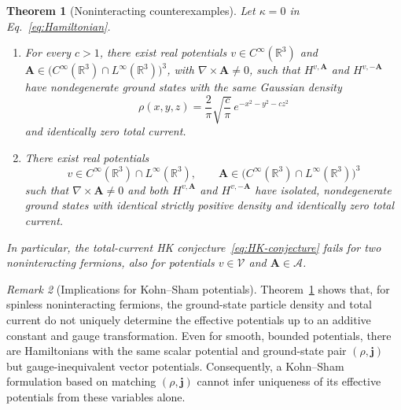 \documentclass[11pt,a4paper]{article}
\newtheorem{theorem}{Theorem}[section]
\theoremstyle{remark}
\newtheorem{remark}[theorem]{Remark}
\theoremstyle{plain}
\newcommand{\R}{\mathbb R}
\newcommand{\jj}{\mathbf j}
\newcommand{\A}{\mathbf A}
\begin{document}
\begin{theorem}[Noninteracting counterexamples]
\label{thm:noninteracting}
Let $\kappa=0$ in Eq.~\eqref{eq:Hamiltonian}.
\begin{enumerate}
 \renewcommand{\theenumi}{(\roman{enumi})}%
 \renewcommand{\labelenumi}{\textup{\theenumi}}%
 \item\label{thm:noninteracting-gaussian}
 For every $c>1$, there exist real potentials $v\in C^\infty(\R^3)$
 and $\A\in\bigl(C^\infty(\R^3)\cap L^\infty(\R^3)\bigr)^3$, with
 $\nabla\times\A\ne0$, such that $H^{v,\A}$ and $H^{v,-\A}$ have
 nondegenerate ground states with the same Gaussian density
 \begin{equation*}
  \rho(x,y,z)=\frac2\pi\sqrt{\frac c\pi}\,e^{-x^2-y^2-cz^2}
 \end{equation*}
 and identically zero total current.
 \item\label{thm:noninteracting-bounded}
 There exist real potentials
 \begin{equation*}
  v\in C^\infty(\R^3)\cap L^\infty(\R^3),\qquad
  \A\in\bigl(C^\infty(\R^3)\cap L^\infty(\R^3)\bigr)^3
 \end{equation*}
 such that $\nabla\times\A\ne0$ and both $H^{v,\A}$ and
 $H^{v,-\A}$ have isolated, nondegenerate ground states with identical
 strictly positive density and identically zero total current.
\end{enumerate}
In particular, the total-current HK conjecture~\eqref{eq:HK-conjecture}
fails for two noninteracting fermions, also for potentials
$v\in\mathcal V$ and $\A\in\mathcal A$.
\end{theorem}

\begin{remark}[Implications for Kohn--Sham potentials]
\label{rem:kohn-sham}
Theorem~\ref{thm:noninteracting} shows that, for spinless noninteracting
fermions, the ground-state particle density and total current do not
uniquely determine the effective potentials up to an additive constant
and gauge transformation. Even for smooth, bounded potentials, there are
Hamiltonians with the same scalar potential and ground-state pair
$(\rho,\jj)$ but gauge-inequivalent vector potentials. Consequently, a
Kohn--Sham formulation based on matching $(\rho,\jj)$
\cite{KS1965,VR1988} cannot infer uniqueness of its effective potentials
from these variables alone.
\end{remark}
\end{document}

